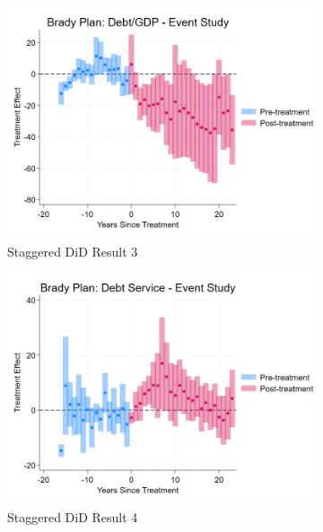\begin{figure}[ht!]
    \begin{subfigure}[b]{0.48\textwidth}
        \centering
        \includegraphics[width=\textwidth]{figures/CS_Brady_Debt_EventStudy.png}
        \caption{Staggered DiD Result 3}
        \label{fig:stag3}
    \end{subfigure}
    \hfill
    \begin{subfigure}[b]{0.48\textwidth}
        \centering
        \includegraphics[width=\textwidth]{figures/CS_Brady_DebtService_EventStudy.png}
        \caption{Staggered DiD Result 4}
        \label{fig:stag4}
    \end{subfigure}
    \\[1em]
    \begin{subfigure}[b]{0.48\textwidth}

\end{subfigure}
\end{figure}
